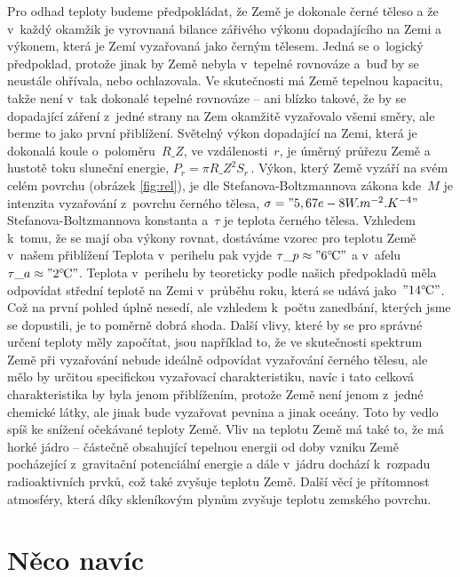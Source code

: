 \documentclass[twoside]{fksserie}
\begin{document}
Pro odhad teploty budeme předpokládat, že Země je dokonale černé 
těleso a že v~každý okamžik je vyrovnaná bilance zářivého výkonu 
dopadajícího na Zemi a výkonem, která je Zemí vyzařovaná jako 
černým tělesem. Jedná se o~logický předpoklad, protože jinak by Země
nebyla v~tepelné rovnováze a~buď by se neustále ohřívala, nebo 
ochlazovala. Ve skutečnosti má Země tepelnou kapacitu, takže není 
v~tak dokonalé tepelné rovnováze -- ani blízko takové, že by se 
dopadající záření z~jedné strany na Zem okamžitě vyzařovalo všemi 
směry, ale berme to jako první přiblížení. Světelný výkon dopadající
na Zemi, která je dokonalá koule o~poloměru~$R\_Z$, ve vzdálenosti~$r$,
je úměrný průřezu Země a hustotě toku sluneční energie, $
P_r = \pi R\_Z^2 S_r \,.  
$
Výkon, který Země vyzáří na svém celém povrchu (obrázek \ref{fig:rel}), je dle 
Stefanova-Boltzmannova zákona 
kde~$M$ je intenzita vyzařování z~povrchu černého tělesa, $\sigma
= "5,67e-8 W.m^{-2}.K^{-4}"$ Stefanova-Boltzmannova konstanta 
a~$\tau$ je teplota černého tělesa. Vzhledem k~tomu, že se mají 
oba výkony rovnat, dostáváme vzorec pro teplotu Země v~našem přiblížení
Teplota v~perihelu pak vyjde $\tau\_p \approx "6 ^\circ\mskip-2mu\mathrm{C}"$ a v~afelu $\tau\_a \approx
"2 ^\circ\mskip-2mu\mathrm{C}"$. Teplota v~perihelu by teoreticky podle našich předpokladů
měla odpovídat střední teplotě na Zemi v~průběhu roku, která se udává
jako~$"14 ^\circ\mskip-2mu\mathrm{C}"$. Což na první pohled úplně nesedí, ale vzhledem k~počtu
zanedbání, kterých jsme se dopustili, je to poměrně dobrá shoda. Další 
vlivy, které by se pro správné určení teploty měly započítat, jsou 
například to, že ve skutečnosti spektrum Země při vyzařování nebude 
ideálně odpovídat vyzařování černého tělesu, ale mělo by určitou 
specifickou vyzařovací charakteristiku, navíc i tato celková 
charakteristika by byla jenom přiblížením, protože Země není jenom 
z~jedné chemické látky, ale jinak bude vyzařovat pevnina a jinak 
oceány. Toto by vedlo spíš ke snížení očekávané teploty Země. Vliv na
teplotu Země má také to, že má horké jádro -- částečně obsahující 
tepelnou energii od doby vzniku Země pocházející z~gravitační
potenciální energie a dále v~jádru dochází k~rozpadu radioaktivních 
prvků, což také zvyšuje teplotu Země.
Další věcí je přítomnost atmosféry, která díky skleníkovým
plynům zvyšuje teplotu zemského povrchu.


\section{Něco navíc}
\end{document}
